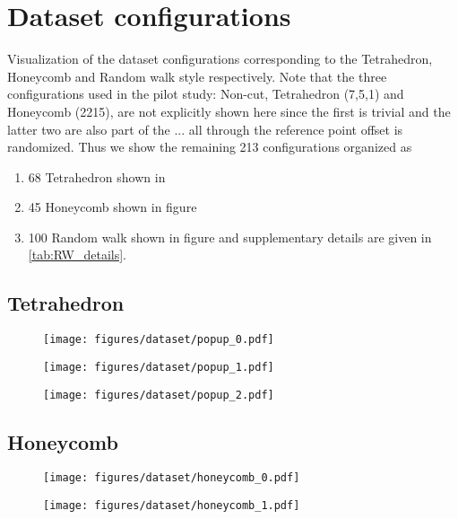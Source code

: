 \section{Dataset configurations}\label{sec:dataset_conf}

Visualization of the dataset configurations corresponding to the Tetrahedron, Honeycomb and Random walk style respectively. Note that the three configurations used in the pilot study: Non-cut, Tetrahedron (7,5,1) and Honeycomb (2215), are not explicitly shown here since the first is trivial and the latter two are also part of the ... all through the reference point offset is randomized. Thus we show the remaining 213 configurations organized as
\begin{enumerate}
    \item 68 Tetrahedron shown in  
    \item 45 Honeycomb shown in figure 
    \item 100 Random walk shown in figure  and supplementary details are given in \cref{tab:RW_details}.
\end{enumerate}


\subsection{Tetrahedron}
\begin{figure}[H]
    \centering
    \texttt{[image: figures/dataset/popup\_0.pdf]}
    \caption{}
    \label{fig:T0}
\end{figure}
\begin{figure}[H]
    \centering
    \texttt{[image: figures/dataset/popup\_1.pdf]}
    \caption{}
    \label{fig:T1}
\end{figure}
\begin{figure}[H]
    \centering
    \texttt{[image: figures/dataset/popup\_2.pdf]}
    \caption{}
    \label{fig:T2}
\end{figure}


\subsection{Honeycomb}
\begin{figure}[H]
    \centering
    \texttt{[image: figures/dataset/honeycomb\_0.pdf]}
    \caption{}
    \label{fig:H0}
\end{figure}
\begin{figure}[H]
    \centering
    \texttt{[image: figures/dataset/honeycomb\_1.pdf]}
    \caption{}
    \label{fig:H1}
\end{figure}

